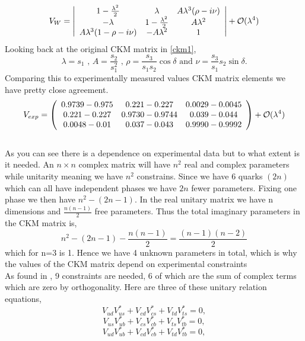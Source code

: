 \begin{equation}\label{VW1}
V_{W} =\left| \begin{array}{ccc} 1-\frac{\lambda^2}{2} & \lambda & A\lambda^3(\rho-i\nu) \\ -\lambda & 1-\frac{\lambda^2}{2} & A\lambda^2 \\ A\lambda^3(1-\rho-i\nu) &  -A\lambda^2 & 1 \end{array}\right| + {\cal{O}}(\lambda^{4})
\end{equation}
Looking back at the original CKM matrix in \ref{ckm1},
\[\lambda =s_{1}\mbox{  ,    } A=\frac{s_{2}}{s^{2}_{1}}\mbox{  ,    } \rho =\frac{s_{3}}{s_{1}s_{2}}\cos\delta \mbox{ and } \nu = \frac{s_3}{s_1}{s_2}\sin\delta.\]
Comparing this to experimentally measured values CKM matrix elements we have pretty close agreement.
\begin{equation}\label{VEXP1}
V_{exp} = \left( \begin{array}{ccc} 0.9739-0.975 & 0.221-0.227 & 0.0029-0.0045 \\ 0.221-0.227 & 0.9730-0.9744 & 0.039-0.044 \\ 0.0048-0.01 &  0.037-0.043 & 0.9990-0.9992 \end{array}\right) + {\cal{O}}(\lambda^{4})
\end{equation}
\\
As you can see there is a dependence on experimental data but to what extent is it needed. An $n\times n$ complex matrix will have $n^2$ real and complex parameters while unitarity meaning we have $n^2$ constrains. Since we have 6 quarks $(2n)$ which can all have independent phases we have $2n$ fewer parameters. Fixing one phase we then have $n^2 - (2n - 1)$. In the real unitary matrix we have n dimensions and $\frac{n(n-1)}{2}$ free parameters. Thus the total imaginary parameters in the CKM matrix is,
\begin{equation}\label{par1}
n^2 - (2n - 1)-\frac{n(n-1)}{2} = \frac{(n-1)(n-2)}{2}
\end{equation}
 which for n=3 is 1. Hence we have 4 unknown parameters in total, which is why the values of the CKM matrix depend on experimental constraints \cite{CKM7}
\\

As found in \cite{CKM5}, 9 constraints are needed, 6 of which are the sum of complex terms which are zero by orthogonality.  Here are three of these unitary relation equations, 
\begin{equation}\label{par2}
V_{ud}V^{*}_{us}+V_{cd}V^{*}_{cs}+V_{td}V^{*}_{ts}=0,
\end{equation}
\begin{equation}\label{par3}
V_{us}V^{*}_{ub}+V_{cs}V^{*}_{cb}+V_{ts}V^{*}_{tb}=0,
\end{equation}
\begin{equation}\label{par4}
V_{ud}V^{*}_{ub}+V_{cd}V^{*}_{cb}+V_{td}V^{*}_{tb}=0,
\end{equation}

